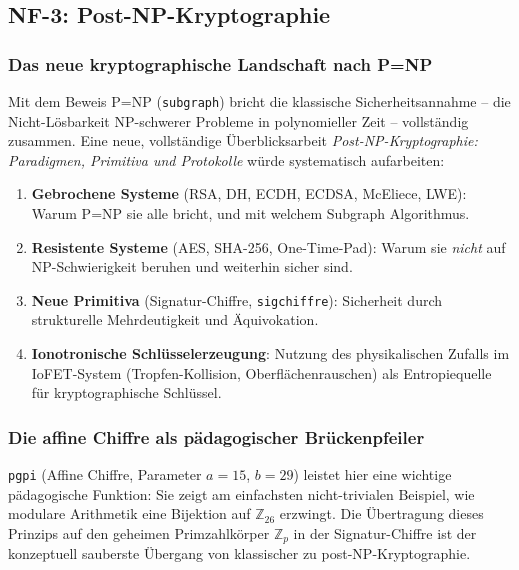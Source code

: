 ﻿\documentclass[a4paper,12pt]{scrreprt}
\theoremstyle{definition}
\begin{document}
\subsection{NF-3: Post-NP-Kryptographie}

\subsubsection{Das neue kryptographische Landschaft nach P=NP}

Mit dem Beweis P=NP (\texttt{subgraph}) bricht die klassische
Sicherheitsannahme -- die Nicht-Lösbarkeit NP-schwerer Probleme in
polynomieller Zeit -- vollständig zusammen. Eine neue, vollständige
Überblicksarbeit \emph{Post-NP-Kryptographie: Paradigmen, Primitiva und
Protokolle} würde systematisch aufarbeiten:

\begin{enumerate}
  \item \textbf{Gebrochene Systeme} (RSA, DH, ECDH, ECDSA, McEliece,
    LWE): Warum P=NP sie alle bricht, und mit welchem Subgraph Algorithmus.
  \item \textbf{Resistente Systeme} (AES, SHA-256, One-Time-Pad):
    Warum sie \emph{nicht} auf NP-Schwierigkeit beruhen und weiterhin
    sicher sind.
  \item \textbf{Neue Primitiva} (Signatur-Chiffre, \texttt{sigchiffre}):
    Sicherheit durch strukturelle Mehrdeutigkeit und Äquivokation.
  \item \textbf{Ionotronische Schlüsselerzeugung}: Nutzung des
    physikalischen Zufalls im IoFET-System (Tropfen-Kollision,
    Oberflächenrauschen) als Entropiequelle für kryptographische Schlüssel.
\end{enumerate}

\subsubsection{Die affine Chiffre als pädagogischer Brückenpfeiler}

\texttt{pgpi} (Affine Chiffre, Parameter $a=15$, $b=29$) leistet hier
eine wichtige pädagogische Funktion: Sie zeigt am einfachsten
nicht-trivialen Beispiel, wie modulare Arithmetik eine Bijektion auf
$\mathbb{Z}_{26}$ erzwingt. Die Übertragung dieses Prinzips auf den
geheimen Primzahlkörper $\mathbb{Z}_p$ in der Signatur-Chiffre ist
der konzeptuell sauberste Übergang von klassischer zu post-NP-Kryptographie.
\end{document}

